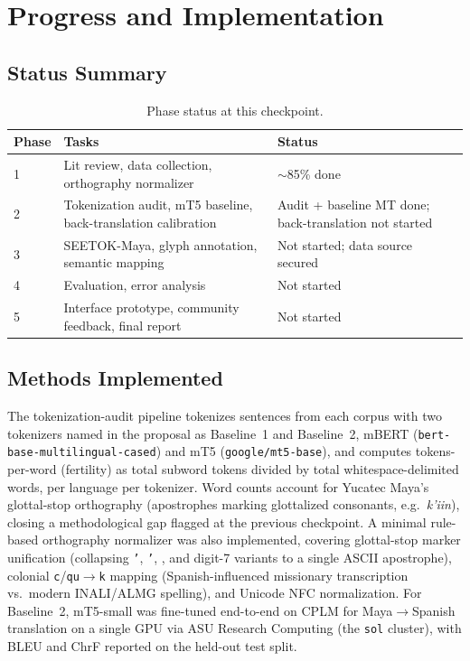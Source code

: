 \documentclass[11pt]{article}
\begin{document}
\section{Progress and Implementation}
\label{sec:progress}

\subsection{Status Summary}

\begin{table}[h]
\centering
\small
\setlength{\tabcolsep}{3pt}
\begin{tabular}{p{1.1cm} p{4.6cm} p{1.9cm}}
\toprule
\textbf{Phase} & \textbf{Tasks} & \textbf{Status} \\
\midrule
1 & Lit review, data collection, orthography normalizer & $\sim$85\% done \\[2pt]
2 & Tokenization audit, mT5 baseline, back-translation calibration & Audit + baseline MT done; back-translation not started \\[2pt]
3 & SEETOK-Maya, glyph annotation, semantic mapping & Not started; data source secured \\[2pt]
4 & Evaluation, error analysis & Not started \\[2pt]
5 & Interface prototype, community feedback, final report & Not started \\
\bottomrule
\end{tabular}
\caption{Phase status at this checkpoint.}
\label{tab:status}
\end{table}

\subsection{Methods Implemented}

The tokenization-audit pipeline tokenizes sentences from each corpus with two
tokenizers named in the proposal as Baseline~1 and Baseline~2, mBERT
(\texttt{bert-base-multilingual-cased}) and mT5
(\texttt{google/mt5-base}), and computes tokens-per-word (fertility) as
total subword tokens divided by total whitespace-delimited words, per
language per tokenizer. Word counts account for Yucatec Maya's glottal-stop
orthography (apostrophes marking glottalized consonants, e.g.\
\textit{k'iin}), closing a methodological gap flagged at the previous
checkpoint. A minimal rule-based orthography normalizer was also implemented,
covering glottal-stop marker unification (collapsing \texttt{'}, \texttt{'},
\texttt{\textasciigrave}, and digit-7 variants to a single ASCII apostrophe),
colonial \texttt{c}/\texttt{qu}$\to$\texttt{k} mapping (Spanish-influenced
missionary transcription vs.\ modern INALI/ALMG spelling), and Unicode NFC
normalization. For Baseline~2, mT5-small was fine-tuned end-to-end on CPLM for
Maya$\to$Spanish translation on a single GPU via ASU Research Computing (the
\texttt{sol} cluster), with BLEU and ChrF reported on the held-out test split.
\end{document}
